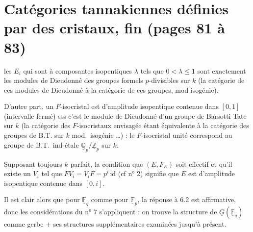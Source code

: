 \documentclass[11pt,a4paper]{article}
\begin{document}
\section*{Catégories tannakiennes définies par des cristaux, fin (pages 81 à 83)}


les $E_{i}$ qui sont à composantes isopentiques $\lambda$ tels que
$0 < \lambda \leq 1$ sont exactement les modules de Dieudonné des groupes
formels $p$-divisibles sur $k$ (la catégorie de ces modules de Dieudonné
  à la catégorie de ces groupes, mod
isogénie).

D'autre part, un $F$-isocristal est d'amplitude isopentique contenue dans
$[0,1]$ (intervalle fermé) sss c'est le module de Dieudonné d'un groupe de
Barsotti-Tate sur $k$ (la catégorie des $F$-isocristaux envisagée étant
équivalente à la catégorie des groupes de B.T. sur $k$ mod.\ isogénie …) : le $F$-isocristal unité correspond au groupe de B.T.\ ind-étale $\underline{\mathbb{Q}}_{p}/\underline{\mathbb{Z}}_{p}$ sur $k$.

Supposant toujours $k$ parfait, la condition
 que $(E, F_{E})$ soit effectif et qu'il
existe un $V_{i}$  tel que
$F V_{i} = V_{i} F = p^{i}\,\mathrm{id}$ (cf n° 2) signifie que $E$ est
d'amplitude isopentique contenue dans $[0,i]$.

Il est clair alors que pour $\underline{\mathbb{F}}_{q}$ comme pour
$\underline{\mathbb{F}}_{p}$, la réponse à 6.2 est affirmative, donc les
considérations du n° 7 s'appliquent : on trouve la structure de
$\underline{G}(\underline{\mathbb{F}}_{q})$ comme gerbe $+$ ses structures
supplémentaires examinées jusqu'à présent.
\end{document}
